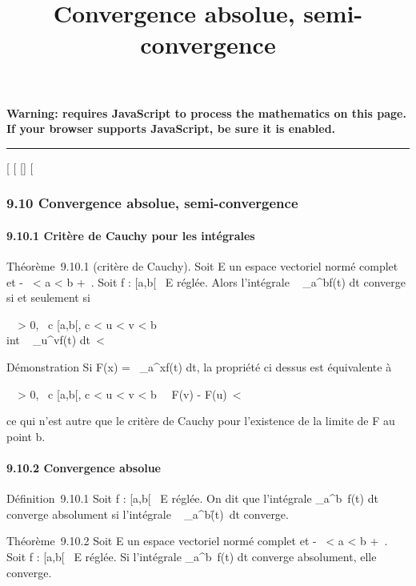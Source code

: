 \documentclass[]{article}
\title{Convergence absolue, semi-convergence}
\author{}
\date{}
\begin{document}
\maketitle

\textbf{Warning: 
requires JavaScript to process the mathematics on this page.\\ If your
browser supports JavaScript, be sure it is enabled.}

\begin{center}\rule{3in}{0.4pt}\end{center}

[
[
[]
[

\subsubsection{9.10 Convergence absolue, semi-convergence}

\paragraph{9.10.1 Critère de Cauchy pour les intégrales}

Théorème~9.10.1 (critère de Cauchy). Soit E un espace vectoriel normé
complet et -\infty~ < a < b \leq +\infty~. Soit f : [a,b[\rightarrow~ E
réglée. Alors l'intégrale \int ~
_a^bf(t) dt converge si et seulement si~

\forall~~\epsilon > 0,
\exists~c \in [a,b[, c < u < v
< b \rigtharrow~\\int ~
_u^vf(t) dt\ < \epsilon

Démonstration Si F(x) =\int ~
_a^xf(t) dt, la propriété ci dessus est équivalente à

\forall~~\epsilon > 0,
\exists~c \in [a,b[, c < u < v
< b \rigtharrow~\ F(v) -
F(u)\ < \epsilon

ce qui n'est autre que le critère de Cauchy pour l'existence de la
limite de F au point b.

\paragraph{9.10.2 Convergence absolue}

Définition~9.10.1 Soit f : [a,b[\rightarrow~ E réglée. On dit que l'intégrale
\int  _a^b~f(t) dt converge
absolument si l'intégrale \int ~
_a^b\f(t)\
dt converge.

Théorème~9.10.2 Soit E un espace vectoriel normé complet et -\infty~
< a < b \leq +\infty~. Soit f : [a,b[\rightarrow~ E réglée. Si
l'intégrale \int  _a^b~f(t) dt
converge absolument, elle converge.
\end{document}
